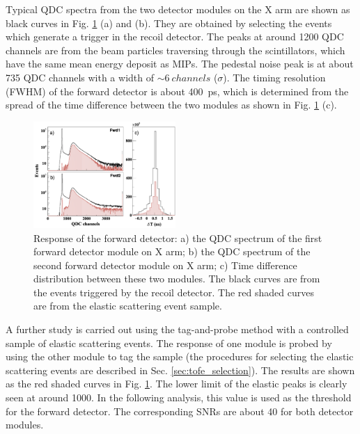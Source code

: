 \documentclass[number,5p]{elsarticle}
\begin{document}
Typical QDC spectra from the two detector modules on the X arm are shown as
black curves in Fig. \ref{fig:fwd_performance} (a) and (b).
They are obtained by selecting the events which generate a trigger in the recoil detector.
The peaks at around \num{1200} QDC channels are from the beam particles
traversing through the scintillators, which have the same mean energy deposit as MIPs.
The pedestal noise peak is at about \num{735} QDC channels with a width of
$\sim\SI{6}{channels}$ ($\sigma$).
The timing resolution (FWHM) of the forward detector is about \SI{400}{ps}, which is determined from the spread of the time difference between the two modules as shown in Fig. \ref{fig:fwd_performance} (c).
\begin{figure}[h!]
  \centering
  \includegraphics[width=0.48\textwidth]{./fwd_performance_elastic.png}
  \caption{Response of the forward detector: a) the QDC spectrum of the first forward detector module on X arm;
    b) the QDC spectrum of the second forward detector module on X arm; c) Time
    difference distribution between these two modules.
    The black curves are from the events triggered by the recoil
    detector.
    The red shaded curves are from the elastic scattering event sample.
  }
  \label{fig:fwd_performance}
\end{figure}

A further study is carried out using the tag-and-probe method with a controlled
sample of elastic scattering events.
The response of one module is probed by using the other module to tag the sample
(the procedures for selecting the elastic scattering events are described in Sec. \ref{sec:tofe_selection}).
The results are shown as the red shaded curves in Fig. \ref{fig:fwd_performance}.
The lower limit of the elastic peaks is clearly seen at around \num{1000}.
In the following analysis, this value is used as the threshold for the forward detector.
The corresponding SNRs are about \num{40} for both detector modules.
\end{document}
